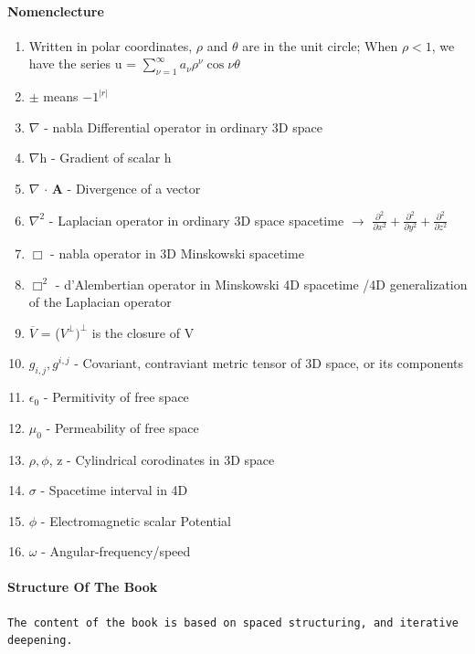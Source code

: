 \documentclass[a4paper, 10pt, onepage]{elegantbook}
\begin{document}
\paragraph{Nomenclecture}
\begin{enumerate}
    \item Written in polar coordinates, $\rho$ and $\theta$ are in the unit circle; When $\rho < 1$, we have the series 
u = $ \sum_{\nu=1}^\infty a_\nu \rho^{\nu} \cos \nu \theta$
    \item $\pm$ means $-1^{|r|}$
    \item $\nabla$ - nabla Differential operator in ordinary 3D space
    \item $\nabla$h - Gradient of scalar h
    \item $\nabla$ $\cdot$ $\mathbf A$ - Divergence of a vector
    \item $\nabla^2$ - Laplacian operator in ordinary 3D space spacetime
    $\longrightarrow$ $\frac{\partial^2}{\partial x^2} + \frac{\partial^2}{\partial y^2} + \frac{\partial^2}{\partial 
z^2}$
    \item $\Box$ - nabla operator in 3D Minskowski spacetime
    \item $\Box^2$ - d'Alembertian operator in Minskowski 4D spacetime /4D generalization of the Laplacian operator
    \item $\overline{V}$ = ($V^\perp)^\perp$ is the closure of V
    \item $g_{i,j}, g^{i,j}$ - Covariant, contraviant metric tensor of 3D space, or its components
    \item $\epsilon_0$ - Permitivity of free space
    \item $\mu_0$ - Permeability of free space
    \item $\rho, \phi$, z - Cylindrical corodinates in 3D space
    \item $\sigma$ - Spacetime interval in 4D
    \item $\phi$ - Electromagnetic scalar Potential
    \item $\omega$ - Angular-frequency/speed

\end{enumerate}

\paragraph{Structure Of The Book}

\begin{lstlisting}
The content of the book is based on spaced structuring, and iterative deepening.
\end{lstlisting}
\end{document}
